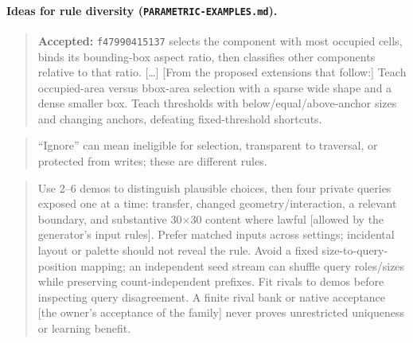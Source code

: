 \documentclass[11pt]{article}
\begin{document}
\paragraph{Ideas for rule diversity (\texttt{PARAMETRIC-EXAMPLES.md}).}
\begin{quote}\small
\textbf{Accepted:} \texttt{f47990415137} selects the component with most
occupied cells, binds its bounding-box aspect ratio, then classifies other
components relative to that ratio. [\dots] [From the proposed extensions
that follow:] Teach occupied-area versus
bbox-area selection with a sparse wide shape and a dense smaller box. Teach
thresholds with below/equal/above-anchor sizes and changing anchors, defeating
fixed-threshold shortcuts.
\end{quote}
\begin{quote}\small
``Ignore'' can mean ineligible for selection, transparent to traversal, or
protected from writes; these are different rules.
\end{quote}
\begin{quote}\small
Use 2--6 demos to distinguish plausible choices, then four private queries
exposed one at a time: transfer, changed geometry/interaction, a relevant
boundary, and substantive 30$\times$30 content where lawful [allowed by the
generator's input rules]. Prefer matched inputs across settings; incidental
layout or palette should not reveal the rule. Avoid a fixed
size-to-query-position mapping; an independent seed stream can shuffle query
roles/sizes while preserving count-independent prefixes. Fit rivals to demos
before inspecting query disagreement. A finite rival bank or native acceptance
[the owner's acceptance of the family] never proves unrestricted uniqueness or
learning benefit.
\end{quote}
\end{document}
